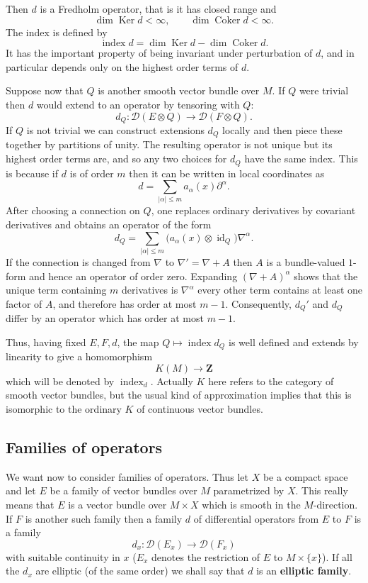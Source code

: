 \documentclass[12pt]{article}
\begin{document}
Then $d$ is a Fredholm operator, that is it has closed range and
\[
\dim\operatorname{Ker}d < \infty, \qquad \dim\operatorname{Coker}d < \infty.
\]
The index is defined by
\[
\operatorname{index}d = \dim\operatorname{Ker}d - \dim\operatorname{Coker}d.
\]
It has the important property of being invariant under perturbation of $d$, and in
particular depends only on the highest order terms of $d$.

Suppose now that $Q$ is another smooth vector bundle over $M$. If $Q$ were trivial then $d$
would extend to an operator by tensoring with $Q$:
\[
d_Q:\mathscr D(E\otimes Q)\longrightarrow \mathscr D(F\otimes Q).
\]
If $Q$ is not trivial we can construct extensions $d_Q$ locally and then piece these
together by partitions of unity. The resulting operator is not unique but its highest
order terms are, and so any two choices for $d_Q$ have the same index. This is because if $d$ is of order \(m\) then it can be written in local coordinates as
\[
    d=\sum_{|\alpha|\le m}a_\alpha(x)\partial^\alpha.
\]
After choosing a connection on \(Q\), one replaces ordinary derivatives by
covariant derivatives and obtains an operator of the form
\[
    d_Q=\sum_{|\alpha|\le m}
    \bigl(a_\alpha(x)\otimes\operatorname{id}_Q\bigr)\nabla^\alpha.
\]
If the connection is changed from \(\nabla\) to $\nabla'=\nabla+A$
then \(A\) is a bundle-valued \(1\)-form and hence an operator of order
zero. Expanding $(\nabla+A)^\alpha$
shows that the unique term containing \(m\) derivatives is $\nabla^\alpha$
every other term contains at least one factor of \(A\), and therefore has
order at most \(m-1\). Consequently, $d_Q'$ and $d_Q$ differ by an operator which
has order at most \(m-1\).

Thus, having fixed $E,F,d$, the map $Q\mapsto \operatorname{index}d_Q$
is well defined and extends by linearity to give a homomorphism
\[
K(M)\longrightarrow \mathbf Z
\]
which will be denoted by $\operatorname{index}_d$. Actually $K$ here refers to the
category of smooth vector bundles, but the usual kind of approximation implies that this
is isomorphic to the ordinary $K$ of continuous vector bundles.

\subsection{Families of operators}
We want now to consider families of operators. Thus let $X$ be a compact space and let
$E$ be a family of vector bundles over $M$ parametrized by $X$. This really means that
$E$ is a vector bundle over $M\times X$ which is smooth in the $M$-direction. If $F$ is
another such family then a family $d$ of differential operators from $E$ to $F$ is a
family
\[
d_x:\mathscr D(E_x)\longrightarrow \mathscr D(F_x)
\]
with suitable continuity in $x$ ($E_x$ denotes the restriction of $E$ to $M\times\{x\}$).
If all the $d_x$ are elliptic (of the same order) we shall say that $d$ is an
\textbf{elliptic family}. 
\end{document}
